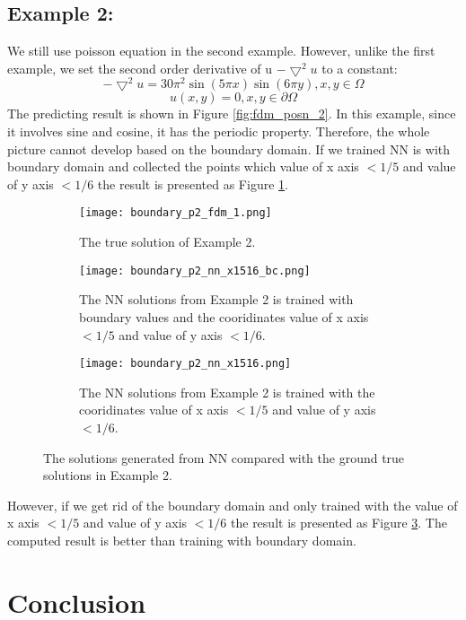 \documentclass{article}
\begin{document}
\subsection{Example 2: }
We still use poisson equation in the second example. However, unlike the first example,  we set the second order derivative of u $-\bigtriangledown^{2} u$ to a constant:
\[ -\bigtriangledown^{2} u = 30\pi^2\sin(5\pi x)\sin(6 \pi y), x,y \in\Omega \]
\[u(x,y) = 0, x,y \in \partial \Omega \]
The predicting result is shown in Figure \ref{fig:fdm_posn_2}.
In this example, since it involves sine and cosine, it has the periodic property. 
Therefore, the whole picture cannot develop based on the boundary domain. 
If we trained NN is with boundary domain and collected the points which value of x axis $<1/5$ and value of y axis $< 1/6$ the result is presented as Figure \ref{fig:fdm_posn_2_1}. 
\begin{figure}[h]
	\begin{subfigure}{0.5\textwidth}
		\texttt{[image: boundary\_p2\_fdm\_1.png]}
		\caption{The true solution of Example 2.}
	\end{subfigure}
	\begin{subfigure}{0.5\textwidth}
		\texttt{[image: boundary\_p2\_nn\_x1516\_bc.png]}
		\caption{The NN solutions from Example 2 is trained with boundary values and the cooridinates value of x axis $< 1/5$ and value of y axis $< 1/6$.}
		\label{fig:fdm_posn_2_1}
	\end{subfigure}
	 \begin{subfigure}{0.5\textwidth}
	 	\texttt{[image: boundary\_p2\_nn\_x1516.png]}
	 	\caption{The NN solutions from Example 2 is trained with the cooridinates value of x axis $<1/5$ and value of y axis $< 1/6$.}
	 	 
	 	\label{fig:fdm_posn_2_2}
	 \end{subfigure}
 \caption{The solutions generated from NN compared with the ground true solutions in Example 2. }
\end{figure}
However, if we get rid of the boundary domain and only trained with the  value of x axis $<1/5$ and value of y axis $< 1/6$ the result is presented as Figure \ref{fig:fdm_posn_2_2}. The computed result is better than training with boundary domain. 


\section{Conclusion}









\end{document}
